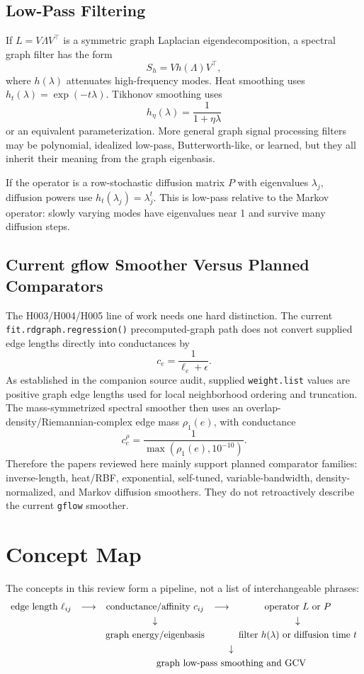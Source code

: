 \documentclass[11pt]{article}
\newcommand{\code}[1]{\texttt{#1}}
\begin{document}
\subsection{Low-Pass Filtering}

If \(L=V\Lambda V^\top\) is a symmetric graph Laplacian eigendecomposition, a
spectral graph filter has the form
\[
  S_h = Vh(\Lambda)V^\top,
\]
where \(h(\lambda)\) attenuates high-frequency modes.  Heat smoothing uses
\(h_t(\lambda)=\exp(-t\lambda)\).  Tikhonov smoothing uses
\[
  h_\eta(\lambda)=\frac{1}{1+\eta\lambda}
\]
or an equivalent parameterization.  More general graph signal processing
filters may be polynomial, idealized low-pass, Butterworth-like, or learned,
but they all inherit their meaning from the graph eigenbasis.

If the operator is a row-stochastic diffusion matrix \(P\) with eigenvalues
\(\lambda_j\), diffusion powers use \(h_t(\lambda_j)=\lambda_j^t\).  This is
low-pass relative to the Markov operator: slowly varying modes have eigenvalues
near 1 and survive many diffusion steps.

\subsection{Current gflow Smoother Versus Planned Comparators}

The H003/H004/H005 line of work needs one hard distinction.  The current
\code{fit.rdgraph.regression()} precomputed-graph path does not convert
supplied edge lengths directly into conductances by
\[
  c_e=\frac{1}{\ell_e+\epsilon}.
\]
As established in the companion source audit, supplied \code{weight.list}
values are positive graph edge lengths used for local neighborhood ordering and
truncation.  The mass-symmetrized spectral smoother then uses an
overlap-density/Riemannian-complex edge mass \(\rho_1(e)\), with conductance
\[
  c_e^\rho=\frac{1}{\max(\rho_1(e),10^{-10})}.
\]
Therefore the papers reviewed here mainly support planned comparator families:
inverse-length, heat/RBF, exponential, self-tuned, variable-bandwidth,
density-normalized, and Markov diffusion smoothers.  They do not retroactively
describe the current \code{gflow} smoother.

\section{Concept Map}

The concepts in this review form a pipeline, not a list of interchangeable
phrases:
\[
\begin{array}{ccccc}
\text{edge length } \ell_{ij}
&\longrightarrow&
\text{conductance/affinity } c_{ij}
&\longrightarrow&
\text{operator } L \text{ or } P\\[3pt]
&& \downarrow && \downarrow\\[3pt]
&& \text{graph energy/eigenbasis}
&& \text{filter } h(\lambda) \text{ or diffusion time } t\\[3pt]
&& \multicolumn{3}{c}{\downarrow}\\[3pt]
&& \multicolumn{3}{c}{\text{graph low-pass smoothing and GCV}}
\end{array}
\]
\end{document}
